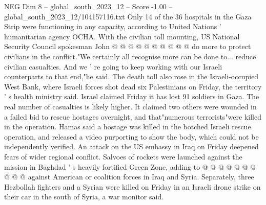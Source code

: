 \begin{textsample}{NEG Dim 8 – global\_south\_2023\_12 – Score -1.00 – global\_south\_2023\_12/104157116.txt}
Only 14 of the 36 hospitals in the Gaza Strip were functioning in any capacity, according to United Nations ' humanitarian agency OCHA.
With the civilian toll mounting, US National Security Council spokesman John @ @ @ @ @ @ @ @ @ @ do more to protect civilians in the conflict."We certainly all recognise more can be done to... reduce civilian casualties.
And we ' re going to keep working with our Israeli counterparts to that end,"he said.
The death toll also rose in the Israeli-occupied West Bank, where Israeli forces shot dead six Palestinians on Friday, the territory ' s health ministry said.
Israel claimed Friday it has lost 91 soldiers in Gaza.
The real number of casualties is likely higher.
It claimed two others were wounded in a failed bid to rescue hostages overnight, and that"numerous terrorists"were killed in the operation.
Hamas said a hostage was killed in the botched Israeli rescue operation, and released a video purporting to show the body, which could not be independently verified.
An attack on the US embassy in Iraq on Friday deepened fears of wider regional conflict.
Salvoes of rockets were launched against the mission in Baghdad ' s heavily fortified Green Zone, adding to @ @ @ @ @ @ @ @ @ @ against American or coalition forces in Iraq and Syria.
Separately, three Hezbollah fighters and a Syrian were killed on Friday in an Israeli drone strike on their car in the south of Syria, a war monitor said.

\end{textsample}
